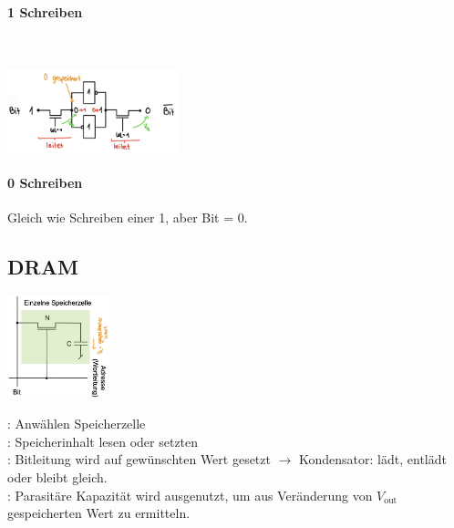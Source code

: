 \paragraph{1 Schreiben}\mbox{}\\
\begin{center}
    \includegraphics[width =50mm]{images/sram_write.JPG}
\end{center}
\paragraph{0 Schreiben} Gleich wie Schreiben einer 1, aber Bit = 0.

\subsection{DRAM}
\begin{center}
    \begin{minipage}{0.45\linewidth}
        \includegraphics[width = 30mm]{images/dram_store.JPG}
    \end{minipage}
    \hfill
    \begin{minipage}{0.5\linewidth}
        : Anwählen Speicherzelle\\
        : Speicherinhalt lesen oder setzten\\
        : Bitleitung wird auf gewünschten Wert gesetzt $\rightarrow$ Kondensator: lädt, entlädt oder bleibt gleich.\\
        : Parasitäre Kapazität wird ausgenutzt, um aus Veränderung von $V_{\text{out}}$ gespeicherten Wert zu ermitteln.
    \end{minipage}
\end{center}

